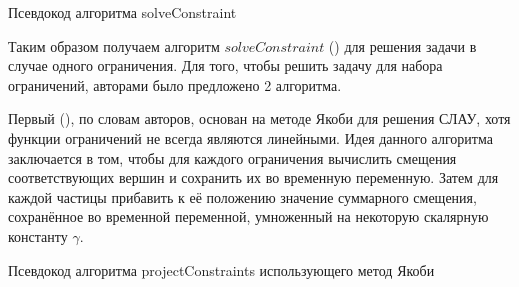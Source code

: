 	\begin{algorithm} %
		\nonl{}
		\caption{Псевдокод алгоритма solveConstraint}\label{alg:SolveConstraint}
	\end{algorithm}
	\FloatBarrier
	\newpage
	
	Таким образом получаем алгоритм $solveConstraint$ () для решения задачи в случае одного ограничения. Для того, чтобы решить задачу для набора ограничений, авторами было предложено 2 алгоритма. 
	
	Первый (), по словам авторов, основан на методе Якоби для решения СЛАУ, хотя функции ограничений не всегда являются линейными. Идея данного алгоритма заключается в том, чтобы для каждого ограничения вычислить смещения соответствующих вершин и сохранить их во временную переменную. Затем для каждой частицы прибавить к её положению значение суммарного смещения, сохранённое во временной переменной, умноженный на некоторую скалярную константу $\gamma$.
	
	\begin{algorithm} %
		\nonl{}
		\caption{Псевдокод алгоритма projectConstraints использующего метод Якоби}\label{alg:projectConstraintsJacobi}
	\end{algorithm}
	\FloatBarrier

